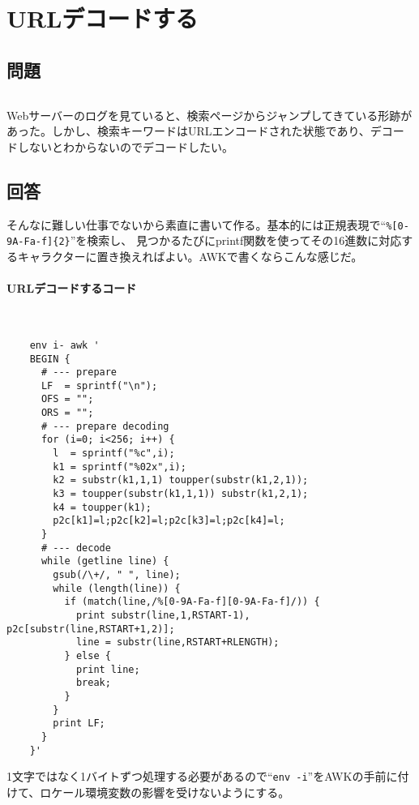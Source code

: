 \section{URLデコードする}
\label{recipe:URL_decode}

\subsection*{問題}
\noindent
$\!\!\!\!\!$
\begin{grshfboxit}{160.0mm}
	Webサーバーのログを見ていると、検索ページからジャンプしてきている形跡があった。しかし、検索キーワードはURLエンコードされた状態であり、デコードしないとわからないのでデコードしたい。
\end{grshfboxit}

\subsection*{回答}
そんなに難しい仕事でないから素直に書いて作る。基本的には正規表現で``\verb|%[0-9A-Fa-f]{2}|''を検索し、
見つかるたびにprintf関数を使ってその16進数に対応するキャラクターに置き換えればよい。AWKで書くならこんな感じだ。

\paragraph{URLデコードするコード} 　\\
\begin{frameboxit}{160.0mm}
\begin{verbatim}
	env i- awk '
	BEGIN {
	  # --- prepare
	  LF  = sprintf("\n");
	  OFS = "";
	  ORS = "";
	  # --- prepare decoding
	  for (i=0; i<256; i++) {
	    l  = sprintf("%c",i);
	    k1 = sprintf("%02x",i);
	    k2 = substr(k1,1,1) toupper(substr(k1,2,1));
	    k3 = toupper(substr(k1,1,1)) substr(k1,2,1);
	    k4 = toupper(k1);
	    p2c[k1]=l;p2c[k2]=l;p2c[k3]=l;p2c[k4]=l;
	  }
	  # --- decode
	  while (getline line) {
	    gsub(/\+/, " ", line);
	    while (length(line)) {
	      if (match(line,/%[0-9A-Fa-f][0-9A-Fa-f]/)) {
	        print substr(line,1,RSTART-1), p2c[substr(line,RSTART+1,2)];
	        line = substr(line,RSTART+RLENGTH);
	      } else {
	        print line;
	        break;
	      }
	    }
	    print LF;
	  }
	}'
\end{verbatim}
\end{frameboxit}

1文字ではなく1バイトずつ処理する必要があるので``\verb|env -i|''をAWKの手前に付けて、ロケール環境変数の影響を受けないようにする。

